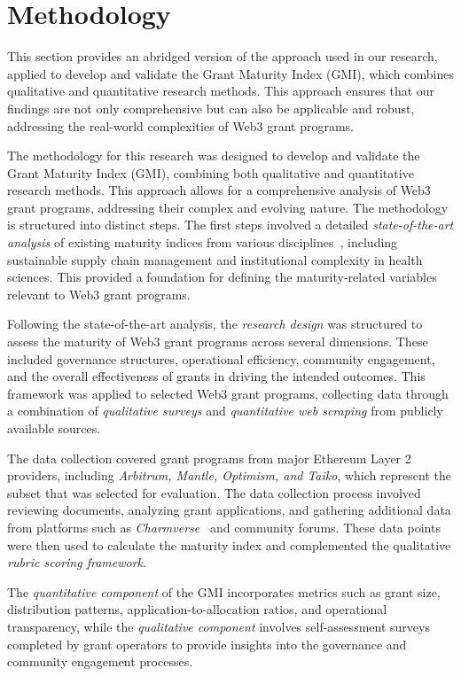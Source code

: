 \documentclass[a4,10pt]{article}
\begin{document}
\section{Methodology}\label{sec_5}
This section provides an abridged version of the approach used in our research, applied to develop and validate the Grant Maturity Index (GMI), which combines qualitative and quantitative research methods. This approach ensures that our findings are not only comprehensive but can also be  applicable and robust, addressing the real-world complexities of Web3 grant programs.

The methodology for this research was designed to develop and validate the Grant Maturity Index (GMI), combining both qualitative and quantitative research methods. This approach allows for a comprehensive analysis of Web3 grant programs, addressing their complex and evolving nature. The methodology is structured into distinct steps. The first steps involved a detailed \textit{state-of-the-art analysis} of existing maturity indices from various disciplines~\cite{11,12,13}, including sustainable supply chain management and institutional complexity in health sciences. This provided a foundation for defining the maturity-related variables relevant to Web3 grant programs.

Following the state-of-the-art analysis, the \textit{research design} was structured to assess the maturity of Web3 grant programs across several dimensions. These included governance structures, operational efficiency, community engagement, and the overall effectiveness of grants in driving the intended outcomes. This framework was applied to selected Web3 grant programs, collecting data through a combination of \textit{qualitative surveys} and \textit{quantitative web scraping} from publicly available sources.

The data collection covered grant programs from major Ethereum Layer 2 providers, including \textit{Arbitrum, Mantle, Optimism, and Taiko}, which represent the subset that was selected for evaluation. The data collection process involved reviewing documents, analyzing grant applications, and gathering additional data from platforms such as \textit{Charmverse}~\cite{14} and community forums. These data points were then used to calculate the maturity index and complemented the qualitative \textit{rubric scoring framework}.

The \textit{quantitative component} of the GMI incorporates metrics such as grant size, distribution patterns, application-to-allocation ratios, and operational transparency, while the \textit{qualitative component} involves self-assessment surveys completed by grant operators to provide insights into the governance and community engagement processes.
\end{document}
